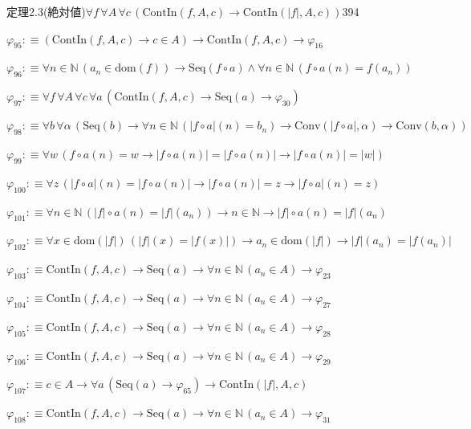 \begin{fullproof}{定理2.3(絶対値)}{$\forall f\,\forall A\,\forall c\,(\mathrm{ContIn}(f,A,c) \to \mathrm{ContIn}(\lvert f \rvert,A,c))$}{394}
\begin{abbrevlist}
\item $\varphi_{95} :\equiv (\mathrm{ContIn}(f,A,c) \to c \in A) \to \mathrm{ContIn}(f,A,c) \to \varphi_{16}$
\item $\varphi_{96} :\equiv \forall n \in \mathbb{N}\,(a_{n} \in \mathrm{dom}(f)) \to \mathrm{Seq}(f \circ a) \land \forall n \in \mathbb{N}\,(f \circ a(n) = f(a_{n}))$
\item $\varphi_{97} :\equiv \forall f\,\forall A\,\forall c\,\forall a\,(\mathrm{ContIn}(f,A,c) \to \mathrm{Seq}(a) \to \varphi_{30})$
\item $\varphi_{98} :\equiv \forall b\,\forall \alpha\,(\mathrm{Seq}(b) \to \forall n \in \mathbb{N}\,(\lvert f \circ a \rvert(n) = b_{n}) \to \mathrm{Conv}(\lvert f \circ a \rvert,\alpha) \to \mathrm{Conv}(b,\alpha))$
\item $\varphi_{99} :\equiv \forall w\,(f \circ a(n) = w \to \lvert f \circ a(n) \rvert = \lvert f \circ a(n) \rvert \to \lvert f \circ a(n) \rvert = \lvert w \rvert)$
\item $\varphi_{100} :\equiv \forall z\,(\lvert f \circ a \rvert(n) = \lvert f \circ a(n) \rvert \to \lvert f \circ a(n) \rvert = z \to \lvert f \circ a \rvert(n) = z)$
\item $\varphi_{101} :\equiv \forall n \in \mathbb{N}\,(\lvert f \rvert \circ a(n) = \lvert f \rvert(a_{n})) \to n \in \mathbb{N} \to \lvert f \rvert \circ a(n) = \lvert f \rvert(a_{n})$
\item $\varphi_{102} :\equiv \forall x \in \mathrm{dom}(\lvert f \rvert)\,(\lvert f \rvert(x) = \lvert f(x) \rvert) \to a_{n} \in \mathrm{dom}(\lvert f \rvert) \to \lvert f \rvert(a_{n}) = \lvert f(a_{n}) \rvert$
\item $\varphi_{103} :\equiv \mathrm{ContIn}(f,A,c) \to \mathrm{Seq}(a) \to \forall n \in \mathbb{N}\,(a_{n} \in A) \to \varphi_{23}$
\item $\varphi_{104} :\equiv \mathrm{ContIn}(f,A,c) \to \mathrm{Seq}(a) \to \forall n \in \mathbb{N}\,(a_{n} \in A) \to \varphi_{27}$
\item $\varphi_{105} :\equiv \mathrm{ContIn}(f,A,c) \to \mathrm{Seq}(a) \to \forall n \in \mathbb{N}\,(a_{n} \in A) \to \varphi_{28}$
\item $\varphi_{106} :\equiv \mathrm{ContIn}(f,A,c) \to \mathrm{Seq}(a) \to \forall n \in \mathbb{N}\,(a_{n} \in A) \to \varphi_{29}$
\item $\varphi_{107} :\equiv c \in A \to \forall a\,(\mathrm{Seq}(a) \to \varphi_{65}) \to \mathrm{ContIn}(\lvert f \rvert,A,c)$
\item $\varphi_{108} :\equiv \mathrm{ContIn}(f,A,c) \to \mathrm{Seq}(a) \to \forall n \in \mathbb{N}\,(a_{n} \in A) \to \varphi_{31}$

\end{abbrevlist}
\end{fullproof}
